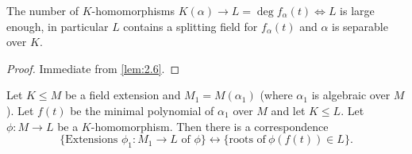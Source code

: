 \documentclass{article}
\begin{document}
\begin{ncor}\label{cor:2.7}
    The number of $K$-homomorphisms $K(\alpha) \to L = \deg f_\alpha(t) \iff L$ is large enough, in particular $L$ contains a splitting field for $f_\alpha(t)$ and $\alpha$ is separable over $K$.
\end{ncor}
\begin{proof}
    Immediate from \cref{lem:2.6}.
\end{proof}
\begin{nlemma}\label{lem:2.8}
    Let $K \leq M$ be a field extension and $M_1 = M(\alpha_1)$ (where $\alpha_1$ is algebraic over $M$).
    Let $f(t)$ be the minimal polynomial of $\alpha_1$ over $M$ and let $K \leq L$.
    Let $\phi: M \to L$ be a $K$-homomorphism. Then there is a correspondence
    \begin{equation*}
        \{\text{Extensions } \phi_1:M_1 \to L \text{ of } \phi\} \longleftrightarrow \{\text{roots of} \ \phi(f(t)) \in L\}.
    \end{equation*}
    \begin{center}
    \end{center}
\end{nlemma}
\end{document}
